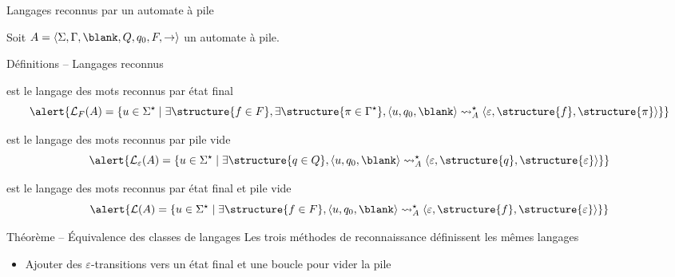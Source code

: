 
\begingroup

\begin{frame}{Langages reconnus par un automate à pile}
  
  Soit $A=\langle \Sigma, \Gamma, \blank, Q, q_0, F, \rightarrow \rangle$ un automate à pile.

  \begin{block}{Définitions -- Langages reconnus}
    \begin{description}[xxxxxx]
    \item[$\mathcal{L}_F(A)$] est le langage des mots reconnus \alert{par état final}
      $$\alert{\mathcal{L}_F(A) = \{u \in \Sigma^\star \mid
      \exists \structure{f\in F}, \exists \structure{\pi\in\Gamma^\star}, \langle u, q_0, \blank \rangle \leadsto_A^\star \langle \varepsilon, \structure{f}, \structure{\pi} \rangle\}}$$
    \item[$\mathcal{L}_\varepsilon(A)$] est le langage des mots reconnus \alert{par pile vide}
      $$\alert{\mathcal{L}_\varepsilon(A) = \{u \in \Sigma^\star \mid
      \exists \structure{q\in Q}, \langle u, q_0, \blank \rangle \leadsto_A^\star \langle \varepsilon, \structure{q}, \structure{\varepsilon} \rangle\}}$$
    \item[$\mathcal{L}(A)$] est le langage des mots reconnus \alert{par état final et pile vide}
      $$\alert{\mathcal{L}(A) = \{u \in \Sigma^\star \mid
      \exists \structure{f\in F}, \langle u, q_0, \blank \rangle \leadsto_A^\star \langle \varepsilon, \structure{f}, \structure{\varepsilon} \rangle\}}$$
    \end{description}
  \end{block}

  \begin{block}{Théorème -- Équivalence des classes de langages}
    Les trois méthodes de reconnaissance définissent les mêmes langages
    \begin{itemize}
    \item Ajouter des $\varepsilon$-transitions vers un état final et une boucle pour vider la pile
    \end{itemize}
  \end{block}

\end{frame}

\endgroup
\endinput
